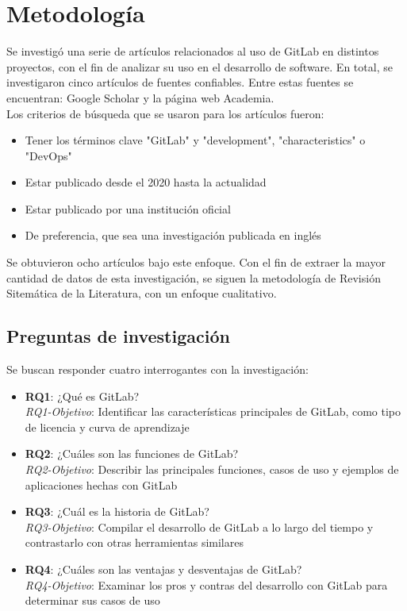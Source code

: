 \documentclass[runningheads]{llncs}
\begin{document}
\section{Metodología}
Se investigó una serie de artículos relacionados al uso de GitLab en distintos proyectos, con el fin
de analizar su uso en el desarrollo de software. En total, se investigaron cinco artículos de fuentes confiables.
Entre estas fuentes se encuentran: Google Scholar y la página web Academia.\\
Los criterios de búsqueda que se usaron para los artículos fueron:
\begin{itemize}
        \item Tener los términos clave "GitLab" y "development", "characteristics" o "DevOps"
        \item Estar publicado desde el 2020 hasta la actualidad
        \item Estar publicado por una institución oficial
        \item De preferencia, que sea una investigación publicada en inglés
\end{itemize}
Se obtuvieron ocho artículos bajo este enfoque. Con el fin de extraer la mayor cantidad de datos de
esta investigación, se siguen la metodología de Revisión Sitemática de la Literatura, con un enfoque
cualitativo.
\subsection{Preguntas de investigación}
Se buscan responder cuatro interrogantes con la investigación:
\begin{itemize}
        \item \textbf{RQ1}: ¿Qué es GitLab?\\
        \textit{RQ1-Objetivo}: Identificar las características principales de GitLab, como tipo de licencia y curva de aprendizaje
        \item \textbf{RQ2}: ¿Cuáles son las funciones de GitLab?\\
        \textit{RQ2-Objetivo}: Describir las principales funciones, casos de uso y ejemplos de aplicaciones hechas con GitLab
        \item \textbf{RQ3}: ¿Cuál es la historia de GitLab?\\
        \textit{RQ3-Objetivo}: Compilar el desarrollo de GitLab a lo largo del tiempo y contrastarlo con otras herramientas similares
        \item \textbf{RQ4}: ¿Cuáles son las ventajas y desventajas de GitLab?\\
        \textit{RQ4-Objetivo}: Examinar los pros y contras del desarrollo con GitLab para determinar sus casos de uso
\end{itemize}
\end{document}
